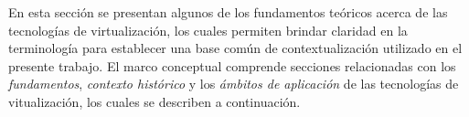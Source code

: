 En esta sección se presentan algunos de los fundamentos teóricos acerca de las tecnologías de virtualización, los cuales permiten brindar claridad en la terminología para establecer una base común de contextualización utilizado en el presente trabajo.  El marco conceptual comprende secciones relacionadas con los \textit{fundamentos}, \textit{contexto histórico} y los \textit{ámbitos de aplicación} de las tecnologías de vitualización, los cuales se describen a continuación.

\newpage


\newpage



\newpage



\newpage



